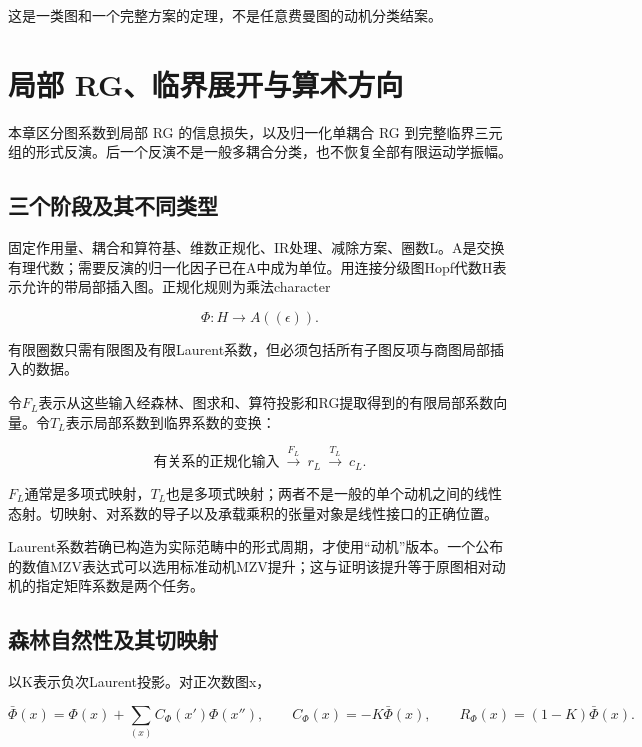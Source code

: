 \documentclass[11pt,a4paper,oneside]{ctexrep}
\theoremstyle{cnplain}
\theoremstyle{definition}
\theoremstyle{remark}
\begin{document}
这是一类图和一个完整方案的定理，不是任意费曼图的动机分类结案。


\chapter{局部 RG、临界展开与算术方向}\label{ch:rg}
本章区分图系数到局部 RG 的信息损失，以及归一化单耦合 RG 到完整临界三元组的形式反演。后一个反演不是一般多耦合分类，也不恢复全部有限运动学振幅。
\section{三个阶段及其不同类型}\label{sec:rg:1}

固定作用量、耦合和算符基、维数正规化、IR处理、减除方案、圈数L。A是交换有理代数；需要反演的归一化因子已在A中成为单位。用连接分级图Hopf代数H表示允许的带局部插入图。正规化规则为乘法character

\begin{equation}
\Phi:H\longrightarrow A((\epsilon)).
\end{equation}

有限圈数只需有限图及有限Laurent系数，但必须包括所有子图反项与商图局部插入的数据。

令\(F_L\)表示从这些输入经森林、图求和、算符投影和RG提取得到的有限局部系数向量。令\(T_L\)表示局部系数到临界系数的变换：

\begin{equation}
\text{有关系的正规化输入}\ \xrightarrow{F_L}\
 r_L\ \xrightarrow{T_L}\ c_L.                    \label{eq:rg:1}
\end{equation}

\(F_L\)通常是多项式映射，\(T_L\)也是多项式映射；两者不是一般的单个动机之间的线性态射。切映射、对系数的导子以及承载乘积的张量对象是线性接口的正确位置。

Laurent系数若确已构造为实际范畴中的形式周期，才使用``动机''版本。一个公布的数值MZV表达式可以选用标准动机MZV提升；这与证明该提升等于原图相对动机的指定矩阵系数是两个任务。

\section{森林自然性及其切映射}\label{sec:rg:2}

以K表示负次Laurent投影。对正次数图x，

\begin{equation}
\bar\Phi(x)=\Phi(x)+\sum_{(x)}C_\Phi(x')\Phi(x''),\qquad
 C_\Phi(x)=-K\bar\Phi(x),\qquad
 R_\Phi(x)=(1-K)\bar\Phi(x).                        \label{eq:rg:2}
\end{equation}
\end{document}
